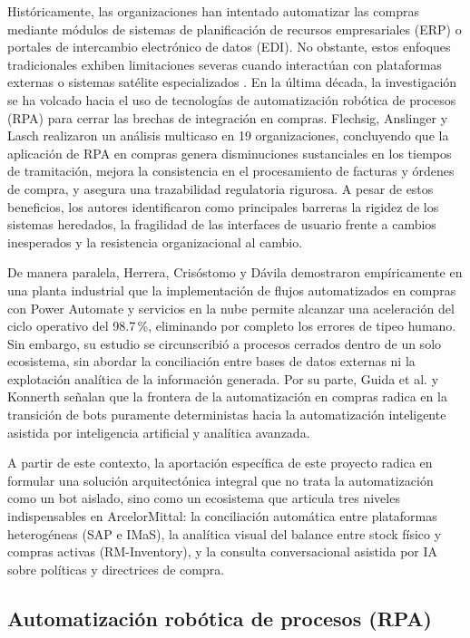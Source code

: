 Históricamente, las organizaciones han intentado automatizar las compras mediante módulos de sistemas de planificación de recursos empresariales (ERP) o portales de intercambio electrónico de datos (EDI). No obstante, estos enfoques tradicionales exhiben limitaciones severas cuando interactúan con plataformas externas o sistemas satélite especializados \cite{themistocleous2004eai}. En la última década, la investigación se ha volcado hacia el uso de tecnologías de automatización robótica de procesos (RPA) para cerrar las brechas de integración en compras. Flechsig, Anslinger y Lasch \cite{flechsig2022rpa} realizaron un análisis multicaso en 19 organizaciones, concluyendo que la aplicación de RPA en compras genera disminuciones sustanciales en los tiempos de tramitación, mejora la consistencia en el procesamiento de facturas y órdenes de compra, y asegura una trazabilidad regulatoria rigurosa. A pesar de estos beneficios, los autores identificaron como principales barreras la rigidez de los sistemas heredados, la fragilidad de las interfaces de usuario frente a cambios inesperados y la resistencia organizacional al cambio.

De manera paralela, Herrera, Crisóstomo y Dávila \cite{herrera2025rpa} demostraron empíricamente en una planta industrial que la implementación de flujos automatizados en compras con Power Automate y servicios en la nube permite alcanzar una aceleración del ciclo operativo del 98.7\,\%, eliminando por completo los errores de tipeo humano. Sin embargo, su estudio se circunscribió a procesos cerrados dentro de un solo ecosistema, sin abordar la conciliación entre bases de datos externas ni la explotación analítica de la información generada. Por su parte, Guida et al. \cite{guida2023ai} y Konnerth \cite{konnerth2023ai} señalan que la frontera de la automatización en compras radica en la transición de bots puramente deterministas hacia la automatización inteligente asistida por inteligencia artificial y analítica avanzada.

A partir de este contexto, la aportación específica de este proyecto radica en formular una solución arquitectónica integral que no trata la automatización como un bot aislado, sino como un ecosistema que articula tres niveles indispensables en ArcelorMittal: la conciliación automática entre plataformas heterogéneas (SAP e IMaS), la analítica visual del balance entre stock físico y compras activas (RM-Inventory), y la consulta conversacional asistida por IA sobre políticas y directrices de compra.

\subsection{Automatización robótica de procesos (RPA)}

